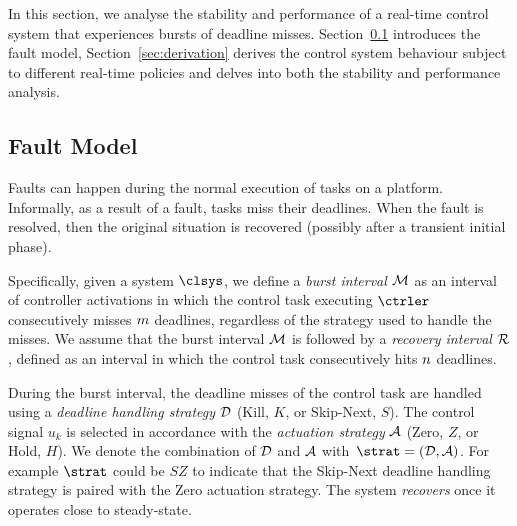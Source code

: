 In this section, we analyse the stability and performance of a real-time control system that experiences bursts of deadline misses. 
Section~\ref{sec:fault} introduces the fault model, Section~\ref{sec:derivation} derives the control system behaviour subject to different real-time policies and delves into both the stability and performance analysis.

\subsection{Fault Model}%
\label{sec:fault}

Faults can happen during the normal execution of tasks on a platform.
Informally, as a result of a fault, tasks miss their deadlines.
When the fault is resolved, then the original situation is recovered (possibly after a transient initial phase).

Specifically, given a system $\clsys$, we define a \emph{burst interval} $\mathcal{M}$ as an interval of controller activations in which the control task executing $\ctrler$ consecutively misses $m$ deadlines, regardless of the strategy used to handle the misses.
We assume that the burst interval $\mathcal{M}$ is followed by a \emph{recovery interval} $\mathcal{R}$, defined as an interval in which the control task consecutively hits $n$ deadlines.

During the burst interval, the deadline misses of the control task are handled using a \emph{deadline handling strategy} $\mathcal{D}$ (Kill, $K$, or Skip-Next, $S$).
The control signal $u_k$ is selected in accordance with the \emph{actuation strategy} $\mathcal{A}$ (Zero, $Z$, or Hold, $H$).
We denote the combination of $\mathcal{D}$ and $\mathcal{A}$ with~$\strat = \left(\dstrat,\hstrat\right)$.
For example $\strat$ could be $SZ$ to indicate that the Skip-Next deadline handling strategy is paired with the Zero actuation strategy.
The system \emph{recovers} once it operates close to steady-state.

